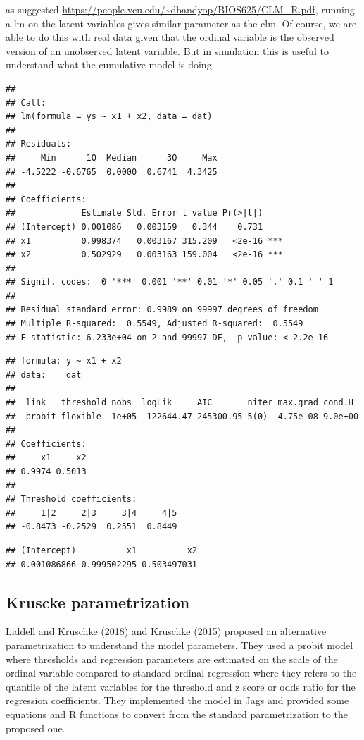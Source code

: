 \documentclass[
  man,floatsintext]{apa6}
\begin{document}
as suggested \url{https://people.vcu.edu/~dbandyop/BIOS625/CLM_R.pdf}, running a lm on the latent variables gives similar parameter as the clm. Of course, we are able to do this with real data given that the ordinal variable is the observed version of an unobserved latent variable. But in simulation this is useful to understand what the cumulative model is doing.

\begin{verbatim}
## 
## Call:
## lm(formula = ys ~ x1 + x2, data = dat)
## 
## Residuals:
##     Min      1Q  Median      3Q     Max 
## -4.5222 -0.6765  0.0000  0.6741  4.3425 
## 
## Coefficients:
##             Estimate Std. Error t value Pr(>|t|)    
## (Intercept) 0.001086   0.003159   0.344    0.731    
## x1          0.998374   0.003167 315.209   <2e-16 ***
## x2          0.502929   0.003163 159.004   <2e-16 ***
## ---
## Signif. codes:  0 '***' 0.001 '**' 0.01 '*' 0.05 '.' 0.1 ' ' 1
## 
## Residual standard error: 0.9989 on 99997 degrees of freedom
## Multiple R-squared:  0.5549, Adjusted R-squared:  0.5549 
## F-statistic: 6.233e+04 on 2 and 99997 DF,  p-value: < 2.2e-16
\end{verbatim}

\begin{verbatim}
## formula: y ~ x1 + x2
## data:    dat
## 
##  link   threshold nobs  logLik     AIC       niter max.grad cond.H 
##  probit flexible  1e+05 -122644.47 245300.95 5(0)  4.75e-08 9.0e+00
## 
## Coefficients:
##     x1     x2 
## 0.9974 0.5013 
## 
## Threshold coefficients:
##     1|2     2|3     3|4     4|5 
## -0.8473 -0.2529  0.2551  0.8449
\end{verbatim}

\begin{verbatim}
## (Intercept)          x1          x2 
## 0.001086866 0.999502295 0.503497031
\end{verbatim}

\subsection{Kruscke parametrization}\label{kruscke-parametrization}

Liddell and Kruschke (2018) and Kruschke (2015) proposed an alternative parametrization to understand the model parameters. They used a probit model where thresholds and regression parameters are estimated on the scale of the ordinal variable compared to standard ordinal regression where they refers to the quantile of the latent variables for the threshold and z score or odds ratio for the regression coefficients. They implemented the model in Jags and provided some equations and R functions to convert from the standard parametrization to the proposed one.
\end{document}
